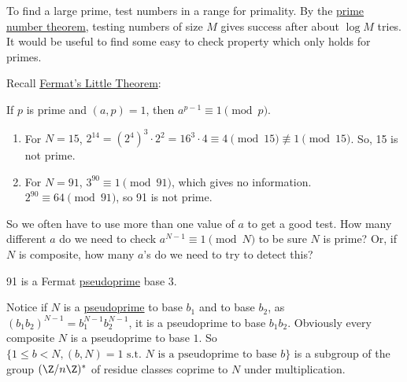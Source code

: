 \documentclass{article}
\begin{document}
To find a large prime, test numbers in a range for primality.
By the \hyperlink{thm:pnt}{prime number theorem}, testing numbers of size $M$ gives success after about $\log M$ tries.
It would be useful to find some easy to check property which only holds for primes.

Recall \hyperlink{thm:fermatLittle}{Fermat's Little Theorem}:
\begin{thm}
    If $p$ is prime and $(a, p)=1$, then $a^{p-1} \equiv 1 \pmod{p}$.
\end{thm}

\begin{eg}\leavevmode
    \begin{enumerate}[label={}]
        \item For $N=15$, $2^{14} = (2^4)^3 \cdot 2^2 = 16^3 \cdot 4 \equiv 4 \pmod{15} \not\equiv 1 \pmod{15}$. So, 15 is not prime.
        \item For $N=91$, $3^{90} \equiv 1 \pmod{91}$, which gives no information. $2^{90} \equiv 64 \pmod{91}$, so 91 is not prime.
    \end{enumerate}
\end{eg}

So we often have to use more than one value of $a$ to get a good test.
How many different $a$ do we need to check $a^{N-1} \equiv 1 \pmod{N}$ to be sure $N$ is prime?
Or, if $N$ is composite, how many $a$'s do we need to try to detect this?


\begin{eg}
    91 is a Fermat \hyperlink{def:pseudo}{pseudoprime} base 3.
\end{eg}

Notice if $N$ is a \hyperlink{def:pseudo}{pseudoprime} to base $b_1$ and to base $b_2$, as $(b_1 b_2)^{N-1} = b_1^{N-1} b_2^{N-1}$, it is a pseudoprime to base $b_1 b_2$.
Obviously every composite $N$ is a pseudoprime to base $1$.
So $\{1 \leq b < N, (b, N) = 1 \text{ s.t. $N$ is a pseudoprime to base } b\}$ is a subgroup of the group $(\Z/n\Z)^*$ of residue classes coprime to $N$ under multiplication.
\end{document}
